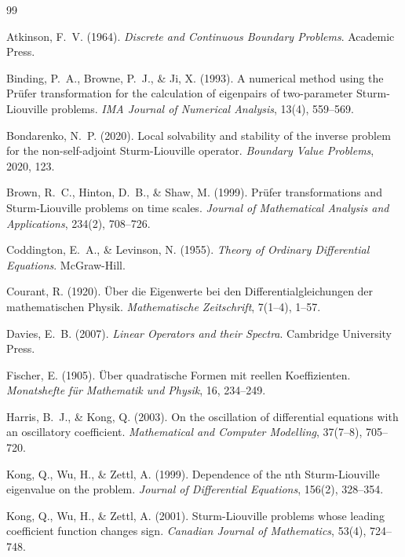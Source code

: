 \documentclass[11pt, reqno]{amsart}
\numberwithin{equation}{section}  %
\theoremstyle{plain}
\theoremstyle{definition}
\theoremstyle{remark}
\begin{document}
\begin{thebibliography}{99}


Atkinson, F.~V. (1964).
\textit{Discrete and Continuous Boundary Problems}.
Academic Press.



Binding, P.~A., Browne, P.~J., \& Ji, X. (1993).
A numerical method using the Pr\"ufer transformation for the calculation of eigenpairs of two-parameter Sturm-Liouville problems.
\textit{IMA Journal of Numerical Analysis}, 13(4), 559--569.

Bondarenko, N.~P. (2020).
Local solvability and stability of the inverse problem for the non-self-adjoint Sturm-Liouville operator.
\textit{Boundary Value Problems}, 2020, 123.

Brown, R.~C., Hinton, D.~B., \& Shaw, M. (1999).
Pr\"ufer transformations and Sturm-Liouville problems on time scales.
\textit{Journal of Mathematical Analysis and Applications}, 234(2), 708--726.

Coddington, E.~A., \& Levinson, N. (1955).
\textit{Theory of Ordinary Differential Equations}.
McGraw-Hill.


Courant, R. (1920). \"Uber die Eigenwerte bei den Differentialgleichungen der mathematischen Physik. 
\textit{Mathematische Zeitschrift}, 7(1--4), 1--57. 

Davies, E.~B. (2007).
\textit{Linear Operators and their Spectra}.
Cambridge University Press.

Fischer, E. (1905). \"Uber quadratische Formen mit reellen Koeffizienten. 
\textit{Monatshefte f\"ur Mathematik und Physik}, 16, 234--249.

Harris, B.~J., \& Kong, Q. (2003).
On the oscillation of differential equations with an oscillatory coefficient.
\textit{Mathematical and Computer Modelling}, 37(7--8), 705--720.



Kong, Q., Wu, H., \& Zettl, A. (1999).
Dependence of the nth Sturm-Liouville eigenvalue on the problem.
\textit{Journal of Differential Equations}, 156(2), 328--354.

Kong, Q., Wu, H., \& Zettl, A. (2001).
Sturm-Liouville problems whose leading coefficient function changes sign.
\textit{Canadian Journal of Mathematics}, 53(4), 724--748.


\end{thebibliography}
\end{document}
